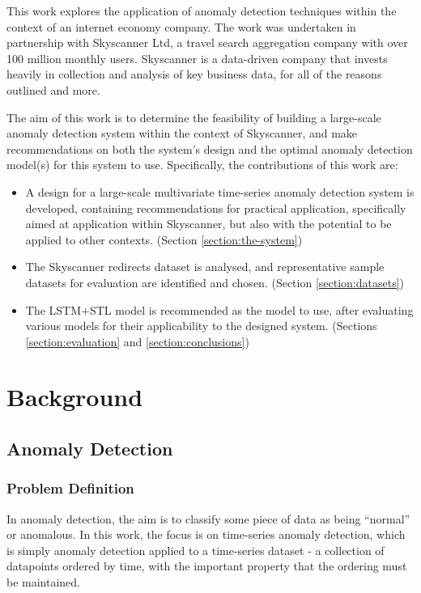 \documentclass{mpaper}
\begin{document}
This work explores the application of anomaly detection techniques within the context of an internet economy company. The work was undertaken in partnership with Skyscanner Ltd, a travel search aggregation company with over 100 million monthly users. Skyscanner is a data-driven company that invests heavily in collection and analysis of key business data, for all of the reasons outlined and more.

The aim of this work is to determine the feasibility of building a large-scale anomaly detection system within the context of Skyscanner, and make recommendations on both the system's design and the optimal anomaly detection model(s) for this system to use. Specifically, the contributions of this work are:
\begin{itemize}
	\item A design for a large-scale multivariate time-series anomaly detection system is developed, containing recommendations for practical application, specifically aimed at application within Skyscanner, but also with the potential to be applied to other contexts. (Section \ref{section:the-system})
	\item The Skyscanner redirects dataset is analysed, and representative sample datasets for evaluation are identified and chosen. (Section \ref{section:datasets})
	\item The LSTM+STL model is recommended as the model to use, after evaluating various models for their applicability to the designed system. (Sections \ref{section:evaluation} and \ref{section:conclusions})
\end{itemize}



\section{Background}

\subsection{Anomaly Detection}
\subsubsection{Problem Definition}
\label{section:problem-definition}

In anomaly detection, the aim is to classify some piece of data as being ``normal'' or anomalous. In this work, the focus is on time-series anomaly detection, which is simply anomaly detection applied to a time-series dataset - a collection of datapoints ordered by time, with the important property that the ordering must be maintained.
\end{document}
